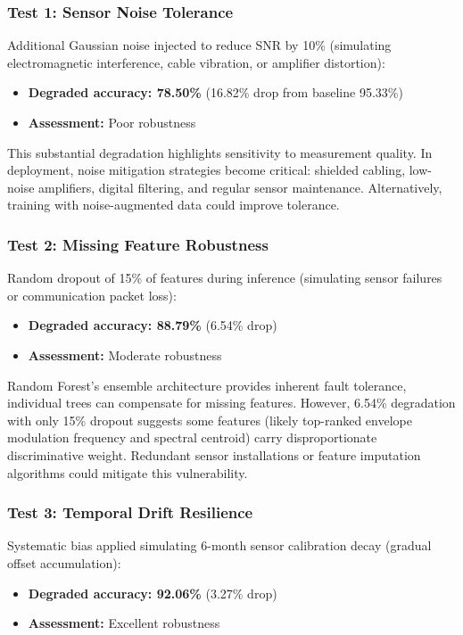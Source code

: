 \documentclass[11pt,a4paper]{article}
\begin{document}
\subsubsection{Test 1: Sensor Noise Tolerance}

Additional Gaussian noise injected to reduce SNR by 10\% (simulating electromagnetic interference, cable vibration, or amplifier distortion):
\begin{itemize}[itemsep=0.2em]
    \item \textbf{Degraded accuracy: 78.50\%} (16.82\% drop from baseline 95.33\%)
    \item \textbf{Assessment:} Poor robustness
\end{itemize}

This substantial degradation highlights sensitivity to measurement quality. In deployment, noise mitigation strategies become critical: shielded cabling, low-noise amplifiers, digital filtering, and regular sensor maintenance. Alternatively, training with noise-augmented data could improve tolerance.

\subsubsection{Test 2: Missing Feature Robustness}

Random dropout of 15\% of features during inference (simulating sensor failures or communication packet loss):
\begin{itemize}[itemsep=0.2em]
    \item \textbf{Degraded accuracy: 88.79\%} (6.54\% drop)
    \item \textbf{Assessment:} Moderate robustness
\end{itemize}

Random Forest's ensemble architecture provides inherent fault tolerance, individual trees can compensate for missing features. However, 6.54\% degradation with only 15\% dropout suggests some features (likely top-ranked envelope modulation frequency and spectral centroid) carry disproportionate discriminative weight. Redundant sensor installations or feature imputation algorithms could mitigate this vulnerability.

\subsubsection{Test 3: Temporal Drift Resilience}

Systematic bias applied simulating 6-month sensor calibration decay (gradual offset accumulation):
\begin{itemize}[itemsep=0.2em]
    \item \textbf{Degraded accuracy: 92.06\%} (3.27\% drop)
    \item \textbf{Assessment:} Excellent robustness
\end{itemize}
\end{document}
